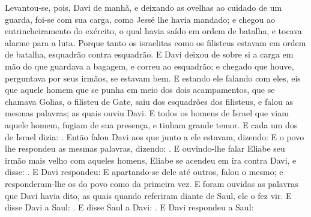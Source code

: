 {  Levantou-se, pois, Davi de manhã, e deixando as ovelhas ao cuidado de um guarda, foi-se com sua carga, como Jessé lhe havia mandado; e chegou ao entrincheiramento do exército, o qual havia saído em ordem de batalha, e tocava alarme para a luta.
  Porque tanto os israelitas como os filisteus estavam em ordem de batalha, esquadrão contra esquadrão.
  E Davi deixou de sobre si a carga em mão do que guardava a bagagem, e correu ao esquadrão; e chegado que houve, perguntava por seus irmãos, se estavam bem.
  E estando ele falando com eles, eis que aquele homem que se punha em meio dos dois acampamentos, que se chamava Golias, o filisteu de Gate, saiu dos esquadrões dos filisteus, e falou as mesmas palavras; as quais ouviu Davi.
  E todos os homens de Israel que viam aquele homem, fugiam de sua presença, e tinham grande temor.
  E cada um dos de Israel dizia: .
  Então falou Davi aos que junto a ele estavam, dizendo: 
  E o povo lhe respondeu as mesmas palavras, dizendo: .
  E ouvindo-lhe falar Eliabe seu irmão mais velho com aqueles homens, Eliabe se acendeu em ira contra Davi, e disse: .
  E Davi respondeu: 
  E apartando-se dele até outros, falou o mesmo; e responderam-lhe os do povo como da primeira vez.
  E foram ouvidas as palavras que Davi havia dito, as quais quando referiram diante de Saul, ele o fez vir.
  E disse Davi a Saul: .
  E disse Saul a Davi: .
  E Davi respondeu a Saul: }
